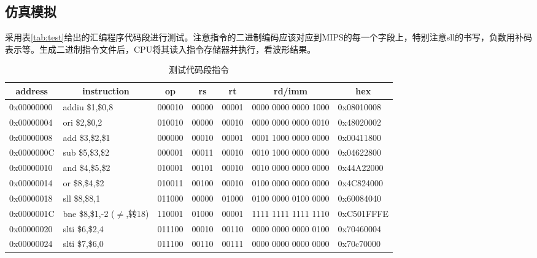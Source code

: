 
\subsection{仿真模拟}
\qquad 采用表\ref{tab:test}给出的汇编程序代码段进行测试。注意指令的二进制编码应该对应到MIPS的每一个字段上，特别注意sll的书写，负数用补码表示等。生成二进制指令文件后，CPU将其读入指令存储器并执行，看波形结果。
\begin{table}[htbp]
  \centering\xiaowu
  \caption{测试代码段指令}
    \begin{tabular}{|l|l|r|l|l|l|l|}
    \hline
    \multicolumn{1}{|c|}{address} & \multicolumn{1}{c|}{instruction} & \multicolumn{1}{c|}{op} & \multicolumn{1}{c|}{rs} & \multicolumn{1}{c|}{rt} & \multicolumn{1}{c|}{rd/imm} & \multicolumn{1}{c|}{hex} \bigstrut\\
    \hline
    0x00000000 & addiu  \$1,\$0,8 & \multicolumn{1}{l|}{000010} & 00000 & 00001 & 0000 0000 0000 1000 & 0x08010008 \bigstrut\\
    \hline
    0x00000004 & ori  \$2,\$0,2 & \multicolumn{1}{l|}{010010} & 00000 & 00010 & 0000 0000 0000 0010 & 0x48020002 \bigstrut\\
    \hline
    0x00000008 & add  \$3,\$2,\$1 & \multicolumn{1}{l|}{000000} & 00010 & 00001 & 0001 1000 0000 0000 & 0x00411800 \bigstrut\\
    \hline
    0x0000000C & sub  \$5,\$3,\$2 & \multicolumn{1}{l|}{000001} & 00011 & 00010 & 0010 1000 0000 0000 & 0x04622800 \bigstrut\\
    \hline
    0x00000010 & and  \$4,\$5,\$2 & \multicolumn{1}{l|}{010001} & 00101 & 00010 & 0010 0000 0000 0000 & 0x44A22000 \bigstrut\\
    \hline
    0x00000014 & or  \$8,\$4,\$2 & \multicolumn{1}{l|}{010011} & 00100 & 00010 & 0100 0000 0000 0000 & 0x4C824000 \bigstrut\\
    \hline
    0x00000018 & sll  \$8,\$8,1 & \multicolumn{1}{l|}{011000} & 00000 & 01000 & 0100 0000 0100 0000 & 0x60084040 \bigstrut\\
    \hline
    0x0000001C & bne \$8,\$1,-2 ($\ne$,转18) & \multicolumn{1}{l|}{110001} & 01000 & 00001 & 1111 1111 1111 1110 & 0xC501FFFE \bigstrut\\
    \hline
    0x00000020 & slti  \$6,\$2,4 & \multicolumn{1}{l|}{011100} & 00010 & 00110 & 0000 0000 0000 0100 & 0x70460004 \bigstrut\\
    \hline
    0x00000024 & slti  \$7,\$6,0 & \multicolumn{1}{l|}{011100} & 00110 & 00111 & 0000 0000 0000 0000 & 0x70c70000 \bigstrut\\

\end{tabular}
\end{table}
